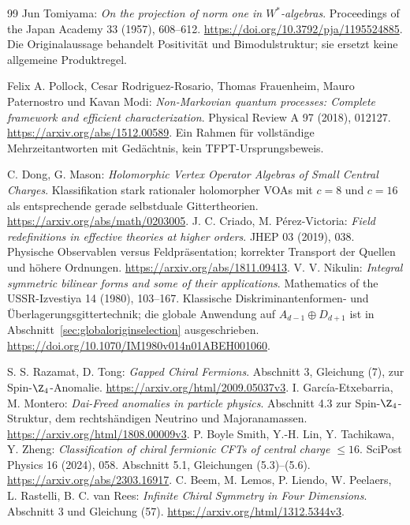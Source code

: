 \begin{thebibliography}{99}
Jun Tomiyama: \emph{On the projection of norm one in $W^*$-algebras}.
Proceedings of the Japan Academy 33 (1957), 608--612.
\url{https://doi.org/10.3792/pja/1195524885}.
Die Originalaussage behandelt Positivität und Bimodulstruktur; sie ersetzt keine allgemeine Produktregel.

Felix A. Pollock, Cesar Rodriguez-Rosario, Thomas Frauenheim, Mauro Paternostro und Kavan Modi:
\emph{Non-Markovian quantum processes: Complete framework and efficient characterization}.
Physical Review A 97 (2018), 012127.
\url{https://arxiv.org/abs/1512.00589}.
Ein Rahmen für vollständige Mehrzeitantworten mit Gedächtnis, kein TFPT-Ursprungsbeweis.

 C. Dong, G. Mason: \emph{Holomorphic Vertex Operator Algebras of Small Central Charges}. Klassifikation stark rationaler holomorpher VOAs mit $c=8$ und $c=16$ als entsprechende gerade selbstduale Gittertheorien. \url{https://arxiv.org/abs/math/0203005}.
 J. C. Criado, M. P\'erez-Victoria: \emph{Field redefinitions in effective theories at higher orders}. JHEP 03 (2019), 038. Physische Observablen versus Feldpräsentation; korrekter Transport der Quellen und höhere Ordnungen. \url{https://arxiv.org/abs/1811.09413}.
 V. V. Nikulin: \emph{Integral symmetric bilinear forms and some of their applications}. Mathematics of the USSR-Izvestiya 14 (1980), 103--167. Klassische Diskriminantenformen- und Überlagerungsgittertechnik; die globale Anwendung auf $A_{d-1}\oplus D_{d+1}$ ist in Abschnitt~\ref{sec:globaloriginselection} ausgeschrieben. \url{https://doi.org/10.1070/IM1980v014n01ABEH001060}.
 S. S. Razamat, D. Tong: \emph{Gapped Chiral Fermions}. Abschnitt 3, Gleichung (7), zur Spin-$\Z_4$-Anomalie. \url{https://arxiv.org/html/2009.05037v3}.
 I. García-Etxebarria, M. Montero: \emph{Dai-Freed anomalies in particle physics}. Abschnitt 4.3 zur Spin-$\Z_4$-Struktur, dem rechtshändigen Neutrino und Majoranamassen. \url{https://arxiv.org/html/1808.00009v3}.
 P. Boyle Smith, Y.-H. Lin, Y. Tachikawa, Y. Zheng: \emph{Classification of chiral fermionic CFTs of central charge $\leq16$}. SciPost Physics 16 (2024), 058. Abschnitt 5.1, Gleichungen (5.3)--(5.6). \url{https://arxiv.org/abs/2303.16917}.
 C. Beem, M. Lemos, P. Liendo, W. Peelaers, L. Rastelli, B. C. van Rees: \emph{Infinite Chiral Symmetry in Four Dimensions}. Abschnitt 3 und Gleichung (57). \url{https://arxiv.org/html/1312.5344v3}.

\end{thebibliography}
